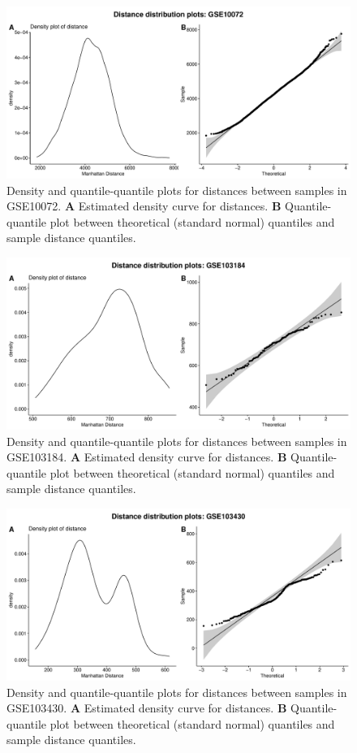 \documentclass[10pt,letterpaper]{article}\usepackage[]{graphicx}\usepackage[]{color}
\begin{document}
\begin{figure}[H]
	\includegraphics[width=\textwidth]{manhattan-distance_hist_GSE10072.pdf}
	\caption{Density and quantile-quantile plots for distances between samples in GSE10072. \textbf{A} Estimated density curve for distances. \textbf{B} Quantile-quantile plot between theoretical (standard normal) quantiles and sample distance quantiles.}
\end{figure}

\begin{figure}[H]
	\includegraphics[width=\textwidth]{manhattan-distance_hist_GSE103184.pdf}
	\caption{Density and quantile-quantile plots for distances between samples in GSE103184. \textbf{A} Estimated density curve for distances. \textbf{B} Quantile-quantile plot between theoretical (standard normal) quantiles and sample distance quantiles.}
\end{figure}

\begin{figure}[H]
	\includegraphics[width=\textwidth]{manhattan-distance_hist_GSE103430.pdf}
	\caption{Density and quantile-quantile plots for distances between samples in GSE103430. \textbf{A} Estimated density curve for distances. \textbf{B} Quantile-quantile plot between theoretical (standard normal) quantiles and sample distance quantiles.}
\end{figure}
\end{document}
